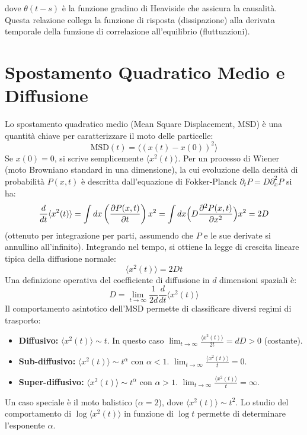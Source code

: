 dove $\theta(t-s)$ è la funzione gradino di Heaviside che assicura la causalità. Questa relazione collega la funzione di risposta (dissipazione) alla derivata temporale della funzione di correlazione all'equilibrio (fluttuazioni).

\section{Spostamento Quadratico Medio e Diffusione}
Lo spostamento quadratico medio (Mean Square Displacement, MSD) è una quantità chiave per caratterizzare il moto delle particelle:
\begin{equation}
\text{MSD}(t) = \langle (x(t)-x(0))^2 \rangle
\end{equation}
Se $x(0)=0$, si scrive semplicemente $\langle x^2(t) \rangle$.
Per un processo di Wiener (moto Browniano standard in una dimensione), la cui evoluzione della densità di probabilità $P(x,t)$ è descritta dall'equazione di Fokker-Planck $\partial_t P = D \partial_x^2 P$ si ha:
\begin{equation}
\frac{d}{dt}\langle x^{2}(t)\rangle = \int dx \left( \frac{\partial P(x,t)}{\partial t} \right) x^2 = \int dx \Bigl(D \frac{\partial^2 P(x,t)}{\partial x^2}\Bigr) x^2 = 2D
\end{equation}
(ottenuto per integrazione per parti, assumendo che $P$ e le sue derivate si annullino all'infinito).
Integrando nel tempo, si ottiene la legge di crescita lineare tipica della diffusione normale:
\begin{equation}
\langle x^{2}(t)\rangle=2Dt
\end{equation}
Una definizione operativa del coefficiente di diffusione in $d$ dimensioni spaziali è:
\begin{equation}
D = \lim_{t\rightarrow\infty}\frac{1}{2d}\frac{d}{dt}\langle x^{2}(t)\rangle
\end{equation}
Il comportamento asintotico dell'MSD permette di classificare diversi regimi di trasporto:
\begin{itemize}
    \item \textbf{Diffusivo:} $\langle x^2(t) \rangle \sim t$. In questo caso $\lim_{t\rightarrow\infty}\frac{\langle x^{2}(t)\rangle}{2t} = dD > 0$ (costante).
    \item \textbf{Sub-diffusivo:} $\langle x^2(t) \rangle \sim t^\alpha$ con $\alpha < 1$. $\lim_{t\rightarrow\infty}\frac{\langle x^{2}(t)\rangle}{t} = 0$.
    \item \textbf{Super-diffusivo:} $\langle x^2(t) \rangle \sim t^\alpha$ con $\alpha > 1$. $\lim_{t\rightarrow\infty}\frac{\langle x^{2}(t)\rangle}{t} = \infty$.
\end{itemize}
Un caso speciale è il moto balistico ($\alpha=2$), dove $\langle x^2(t) \rangle \sim t^2$.
Lo studio del comportamento di $\log \langle x^2(t) \rangle$ in funzione di $\log t$ permette di determinare l'esponente $\alpha$.

